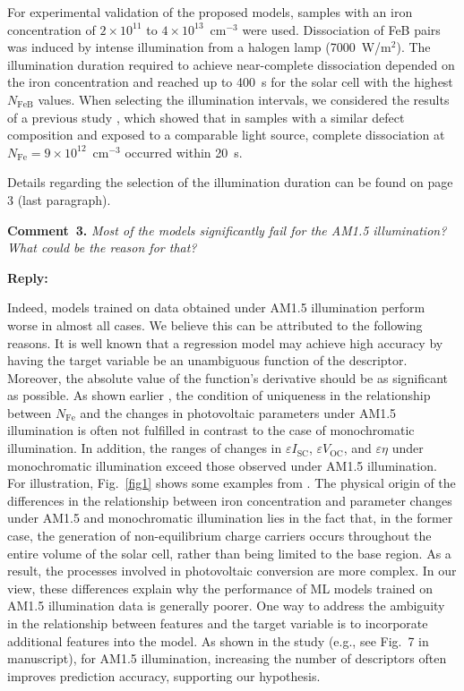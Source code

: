 \documentclass[a4paper,fleqn]{cas-sc}
\begin{document}
For experimental validation of the proposed models, samples with an iron concentration of $2\times10^{11}$ to $4\times10^{13}$~cm$^{-3}$ were used.
Dissociation of FeB pairs was induced by intense illumination from a halogen lamp (7000~W/m$^{2}$).
The illumination duration required to achieve near-complete dissociation depended on the iron concentration
and reached up to 400~s for the solar cell with the highest $N_\mathrm{FeB}$ values.
When selecting the illumination intervals, we considered the results of a previous study \cite{OlikhPSSA},
which showed that in samples with a similar defect composition and exposed to a comparable light source,
complete dissociation at $N_\mathrm{Fe}=9\times10^{12}$~cm$^{-3}$ occurred within 20~s.

Details regarding the selection of the illumination duration can be found on page 3 (last paragraph).




\vspace{1cm}
\noindent
\textcolor[rgb]{0.00,0.50,1.00}{\textbf{Comment~3.}}
\emph{Most of the models significantly fail for the AM1.5 illumination? What could be the reason for that?}

\noindent
\textcolor[rgb]{0.51,0.00,0.00}{\textbf{Reply:}}

Indeed, models trained on data obtained under AM1.5 illumination perform worse in almost all cases. 
We believe this can be attributed to the following reasons.
It is well known that a regression model may  achieve high accuracy 
by having the target variable be an unambiguous function of the descriptor.
Moreover, the absolute value of the function’s derivative should be as significant as possible.
As shown earlier  \cite{Olikh2025MSEB}, the condition of uniqueness in the relationship between $N_\mathrm{Fe}$ and 
the changes in photovoltaic parameters under AM1.5 illumination is often not fulfilled in contrast to the case of monochromatic illumination.
In addition, the ranges of changes in $\varepsilon I_\mathrm{SC}$, $\varepsilon V_\mathrm{OC}$, and $\varepsilon \eta$ 
under monochromatic illumination exceed those observed under AM1.5 illumination.
For illustration, Fig.~\ref{fig1} shows some examples from  \cite{Olikh2025MSEB}.
The physical origin of the differences in the relationship between iron concentration and 
parameter changes under AM1.5 and monochromatic illumination lies in the fact that, 
in the former case, the generation of non-equilibrium charge carriers occurs throughout the 
entire volume of the solar cell, rather than being limited to the base region. 
As a result, the processes involved in photovoltaic conversion are more complex. 
In our view, these differences explain why the performance of ML models trained on AM1.5 illumination data is generally poorer. 
One way to address the ambiguity in the relationship between features and the target variable 
is to incorporate additional features into the model. 
As shown in the study (e.g., see Fig.~7 in manuscript), 
for AM1.5 illumination, increasing the number of descriptors often improves prediction accuracy, supporting our hypothesis.
\end{document}
